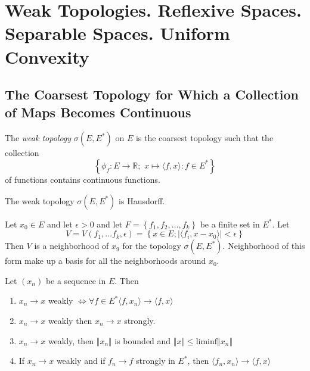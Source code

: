 \section{Weak Topologies. Reflexive Spaces. Separable Spaces. Uniform Convexity}

\subsection{The Coarsest Topology for Which a Collection of Maps Becomes Continuous}

\begin{defn}
	The \textit{weak topology} $ \sigma(E,E^{*})$ on $E$ is the coarsest topology such that the collection
	\[
	\left\{ \phi_{f}:E \to \mathbb{R}; \hspace{4pt} x \mapsto \langle f,x \rangle: f \in E^{*} \right\}
	\]
	of functions contains continuous functions.
\end{defn}

\begin{prop}
	The weak topology $ \sigma(E, E^{*})$ is Hausdorff.
\end{prop}

\begin{prop}
	Let $x_{0} \in E$ and let $ \epsilon > 0$ and let $F = \left\{ f_{1}, f_{2}, \ldots, f_{k} \right\}$ be a finite set  in $E^{*}$. Let
	\[
		V = V( f_{1}, \ldots f_{k}, \epsilon) = \left\{ x \in E; \vert \langle f_{i}, x-x_{0} \rangle \vert < \epsilon \right\}
	\]
	Then $V$ is a neighborhood of $x_{9}$ for the topology $ \sigma(E, E^{*})$. Neighborhood of this form make up a basis for all the neighborhoods around $x_{0}$.
\end{prop}

\begin{prop}
	Let $(x_{n})$ be a sequence in $E$. Then
	\begin{enumerate}
		\item $x_{n} \to x$ weakly $\iff \forall f \in E^{*} \langle f,x_{n} \rangle \to \langle f,x \rangle$
		\item $x_{n} \to x$ weakly then $x_{n} \to x$ strongly.
		\item $x_{n} \to x$ weakly, then $ \Vert x_{n} \Vert$ is bounded and $ \Vert x \Vert \leq \mathrm{liminf} \Vert x_{n} \Vert$
		\item If $x_{n} \to x$ weakly and if $f_{n} \to f$ strongly in $E^{*}$, then $ \langle f_{n}, x_{n} \rangle \to \langle f,x \rangle$
	\end{enumerate}
\end{prop}

